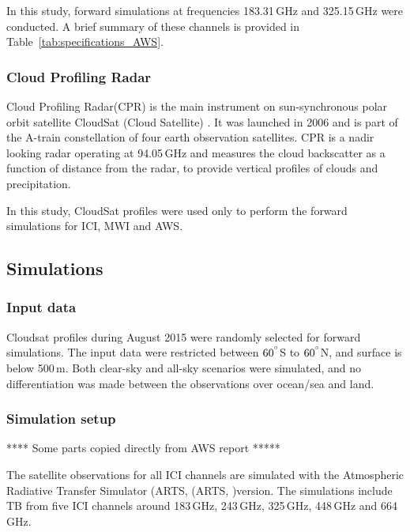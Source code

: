 \documentclass[amt, manuscript]{copernicus}
\begin{document}
In this study, forward simulations at frequencies 183.31\,GHz and 325.15\,GHz were conducted. A brief summary of these channels is provided in Table~\ref{tab:specifications_AWS}.

\subsubsection{Cloud Profiling Radar}
%
Cloud Profiling Radar(CPR) is the main instrument on sun-synchronous polar orbit satellite CloudSat (Cloud Satellite) \citep{Stephens2002cloudsat}. It was launched in 2006 and is part of the A-train constellation of four earth observation satellites. CPR is a nadir looking radar operating at 94.05\,GHz and measures the cloud backscatter as a function of distance from the radar, to provide vertical profiles of clouds and precipitation.

In this study, CloudSat profiles were used only to perform the forward simulations for ICI, MWI and AWS. 

\subsection{Simulations}
\label{sec:arts_simulations}
%
\subsubsection{Input data}
%
Cloudsat profiles during August 2015 were randomly selected for forward simulations. The input data were restricted between $60^{^{\circ}}$S to $60^{^{\circ}}$N, and surface is below 500\,m. Both clear-sky and all-sky scenarios were simulated, and no differentiation was made between the observations over ocean/sea and land. 
\subsubsection{Simulation setup}
%
**** Some parts copied directly from AWS report *****

The satellite observations for all ICI channels are simulated with the Atmospheric Radiative Transfer Simulator (ARTS, (ARTS, \citet{eriksson:arts2:11,buehler:artst:18})version. The simulations include TB from five ICI channels around 183\,GHz, 243\,GHz, 325\,GHz, 448\,GHz and 664\,GHz. 
\end{document}
